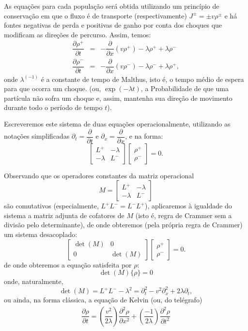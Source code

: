 
As equações para cada população será obtida utilizando um princípio de conservação em que o fluxo é de transporte (respectivamente) \(J^{\pm} = \pm v\rho^\pm\) e há fontes negativas de perda e positivas de ganho por conta dos choques que modificam as direções de percurso. Assim, temos:
\begin{eqnarray}
\dfrac{\partial \rho^+}{\partial t} &=& -\dfrac{\partial }{\partial x} (v\rho^+) - \lambda\rho^+ + \lambda\rho^- \\
\dfrac{\partial \rho^-}{\partial t} &=& -\dfrac{\partial }{\partial x} (v\rho^-) - \lambda\rho^- + \lambda\rho^+,
\end{eqnarray}
onde \(\lambda^(-1)\) é a constante de tempo de Malthus, isto é, o tempo médio de espera para que ocorra um choque. (ou, \(\exp(-\lambda t)\), a Probabilidade de que uma partícula não sofra um choque e, assim, mantenha sua direção de movimento durante todo o período de tempo \(t\)).

Escreveremos este sistema de duas equações operacionalmente, utilizando as notações simplificadas \(\partial_t = \dfrac{\partial }{\partial t}\) e \(\partial_x = \dfrac{\partial }{\partial x}\), e na forma:
\[\left[\begin{array}{cc}
L^+ & -\lambda \\
-\lambda & L^-
\end{array}\right]
\left[\begin{array}{c}
\rho^+ \\
\rho^-
\end{array}\right] = 0.\]


Observando que os operadores constantes da matriz operacional 
\[M = \left[\begin{array}{cc}
L^+ & -\lambda \\
-\lambda & L^-
\end{array}\right]\]
são comutativos (especialmente, \(L^+ L^- = L^- L^+\)), aplicaremos à igualdade do sistema a matriz adjunta de cofatores de \(M\) (isto é, regra de Crammer sem a divisão pelo determinante), de onde obteremos (pela própria regra de Crammer) um sistema desacoplado:
\[\left[\begin{array}{cc}
\det(M) & 0 \\
0 & \det(M)
\end{array}\right]
\left[\begin{array}{c}
\rho^+ \\
\rho^-
\end{array}\right] = 0.\]
de onde obteremos a equação satisfeita por \(\rho\):
\[\det(M) \{\rho\} = 0\]
onde, naturalmente,
\[\det(M) = L^+ L^- - \lambda^2 = \partial_t^2 - v^2\partial_x^2+2\lambda \partial_t,\]
ou ainda, na forma clássica, a equação de Kelvin (ou, do telégrafo)
\begin{eqnarray}
\dfrac{\partial \rho}{\partial t} = \left(\dfrac{v^2}{2\lambda}\right) \dfrac{\partial^2 \rho}{\partial x^2} + \left(\dfrac{-1}{2\lambda}\right) \dfrac{\partial^2 \rho}{\partial t^2}
\end{eqnarray}


